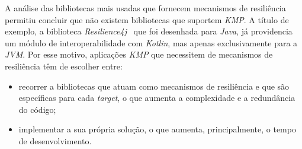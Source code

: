 A análise das bibliotecas mais usadas que fornecem mecanismos de resiliência permitiu concluir que não existem bibliotecas que suportem \textit{KMP}.
A título de exemplo, a biblioteca \textit{Resilience4j}~\cite{resilience4j} que foi desenhada para \textit{Java}, já providencia um módulo de interoperabilidade com \textit{Kotlin}, mas apenas exclusivamente para a \textit{JVM}.
Por esse motivo, aplicações \textit{KMP} que necessitem de mecanismos de resiliência têm de escolher entre:

\begin{itemize}[topsep=0pt,itemsep=0pt,partopsep=0pt, parsep=0pt]
    \item recorrer a bibliotecas que atuam como mecanismos de resiliência e que são específicas para cada \textit{target}, o que aumenta a complexidade e a redundância do código;
    \item implementar a sua própria solução, o que aumenta, principalmente, o tempo de desenvolvimento.
\end{itemize}
